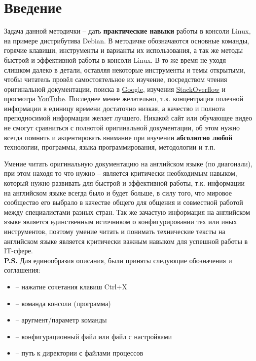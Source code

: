 \chapter{Введение}

Задача данной методички -- дать \textbf{практические навыки} работы в консоли Linux, на примере дистрибутива Debian. В методичке обозначаются основные команды, горячие клавиши, инструменты и варианты их использования, а так же методы быстрой и эффективной работы в консоли Linux. В то же время не уходя слишком далеко в детали, оставляя некоторые инструменты и темы открытыми, чтобы читатель провёл самостоятельное их изучение, посредством чтения оригинальной документации, поиска в \href{https://google.com}{Google}, изучения \href{https://stackoverflow.com}{StackOverflow} и просмотра \href{https://youtube.com}{YouTube}. Последнее менее желательно, т.к. концентрация полезной информации в единицу времени достаточно низкая, а качество и полнота преподносимой информации желает лучшего. Никакой сайт или обучающее видео не смогут сравниться с полнотой оригинальной документации, об этом нужно всегда помнить и акцентировать внимание при изучении \textbf{абсолютно любой} технологии, программы, языка программирования, методологии и т.п.

Умение читать оригинальную документацию на английском языке (по диагонали), при этом находя то что нужно -- является критически необходимым навыком, который нужно развивать для быстрой и эффективной работы, т.к. информации на английском языке всегда было и будет больше, в силу того, что мировое сообщество его выбрало в качестве общего для общения и совместной работой между специалистами разных стран. Так же зачастую информация на английском языке является единственным источником о конфигурировании тех или иных инструментов, поэтому умение читать и понимать технические тексты на английском языке является критически важным навыком для успешной работы в IT-сфере.
\\

\noindent \textbf{P.S.} Для единообразия описания, были приняты следующие обозначения и соглашения:

\begin{itemize}
	\item {} -- нажатие сочетания клавиш Ctrl+X
	\item {} -- команда консоли (программа)
	\item {} -- аругмент/параметр команды
	\item {} -- конфигурационный файл или файл с настройками
	\item {} -- путь к директории с файлами процессов
\end{itemize}

